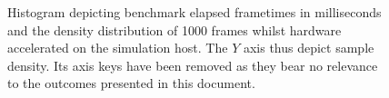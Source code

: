 
\begin{figure}
	\centering
	

	\caption[Benchmark results - hardware accelerated on the simulation host]{Histogram depicting benchmark elapsed frametimes in milliseconds and the density distribution of 1000 frames whilst hardware accelerated on the simulation host. The $Y$ axis thus depict sample density. Its axis keys have been removed as they bear no relevance to the outcomes presented in this document.}
	\label{fig:histogramshost}
\end{figure}